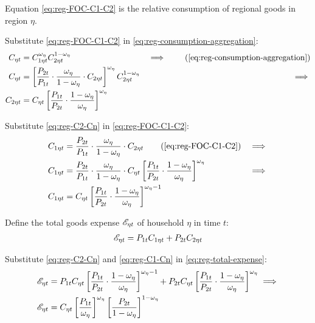 \documentclass[
thesis.tex
]{subfiles}
\begin{document}
Equation \ref{eq:reg-FOC-C1-C2} is the relative consumption of regional goods in region $\eta$.

Substitute \ref{eq:reg-FOC-C1-C2} in \ref{eq:reg-consumption-aggregation}:
\begin{alignat}{2}
	C_{\eta t} &= C_{1\eta t}^{\omega_{\eta}} C_{2\eta t}^{1-\omega_{\eta}} &\implies \tag{\ref{eq:reg-consumption-aggregation}} \\
	C_{\eta t} &= \left[ \frac{P_{2t}}{P_{1t}} \cdot \frac{\omega_{\eta}}{1 -\omega_{\eta}} \cdot C_{2\eta t} \right]^{\omega_{\eta}} C_{2\eta t}^{1-\omega_{\eta}} &\implies \nonumber \\
	C_{2\eta t} &= C_{\eta t} \left[ \frac{P_{1t} }{P_{2t}} \cdot \frac{1 -\omega_{\eta}}{\omega_{\eta}} \right]^{\omega_{\eta}} \label{eq:reg-C2-Cn}
\end{alignat}

Substitute \ref{eq:reg-C2-Cn} in \ref{eq:reg-FOC-C1-C2}:
\begin{alignat}{2}
	C_{1\eta t} &= \frac{P_{2t}}{P_{1t}} \cdot \frac{\omega_{\eta}}{1 -\omega_{\eta}} \cdot C_{2\eta t} \tag{\ref{eq:reg-FOC-C1-C2}} &\implies \nonumber \\
	C_{1\eta t} &= \frac{P_{2t}}{P_{1t}} \cdot \frac{\omega_{\eta}}{1 -\omega_{\eta}} \cdot C_{\eta t} \left[ \frac{P_{1t} }{P_{2t}} \cdot \frac{1 -\omega_{\eta}}{\omega_{\eta}} \right]^{\omega_{\eta}} &\implies \nonumber \\
	C_{1\eta t} &= C_{\eta t} \left[ \frac{P_{1t} }{P_{2t}} \cdot \frac{1 -\omega_{\eta}}{\omega_{\eta}} \right]^{\omega_{\eta} -1} \label{eq:reg-C1-Cn}
\end{alignat}

Define the total goods expense ${\mathscr{E}_{\eta t}}$ of household $\eta$ in time $t$:
\begin{align}
	{\mathscr{E}_{\eta t}} = P_{1 t} C_{1\eta t} + P_{2 t} C_{2\eta t} \label{eq:reg-total-expense}
\end{align}

Substitute \ref{eq:reg-C2-Cn} and \ref{eq:reg-C1-Cn} in \ref{eq:reg-total-expense}:
\begin{align}
	{\mathscr{E}_{\eta t}} &= P_{1 t} C_{\eta t} \left[ \frac{P_{1t} }{P_{2t}} \cdot \frac{1 -\omega_{\eta}}{\omega_{\eta}} \right]^{\omega_{\eta} -1} + P_{2 t} C_{\eta t} \left[ \frac{P_{1t} }{P_{2t}} \cdot \frac{1 -\omega_{\eta}}{\omega_{\eta}} \right]^{\omega_{\eta}} \implies \nonumber \\
	{\mathscr{E}_{\eta t}} &= C_{\eta t} \left[ \frac{P_{1t}}{\omega_{\eta}} \right]^{\omega_{\eta}} \left[ \frac{P_{2t}}{1 -\omega_{\eta}} \right]^{1 -\omega_{\eta}} \label{eq:reg-price-eta-level}
\end{align}
\end{document}
